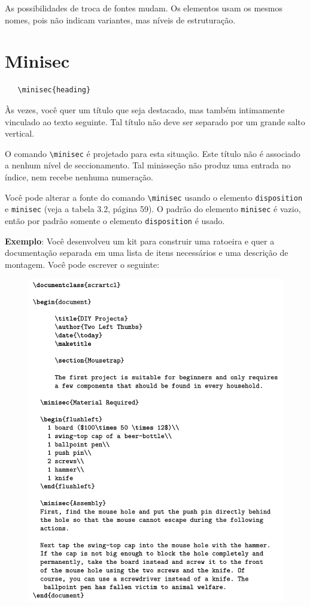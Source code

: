 As possibilidades de troca de fontes mudam. Os elementos usam os mesmos nomes, pois não indicam variantes, mas níveis de estruturação.

\section{Minisec}
\begin{verbatim}
   \minisec{heading} 
\end{verbatim}

Às vezes, você quer um título que seja destacado, mas também intimamente vinculado ao texto seguinte. Tal título não deve ser separado por um grande salto vertical.

O comando \verb|\minisec| é projetado para esta situação. Este título não é associado a nenhum nível de seccionamento. Tal minisseção não produz uma entrada no índice, nem recebe nenhuma numeração.

Você pode alterar a fonte do comando \verb|\minisec| usando o elemento \texttt{disposition} e \texttt{minisec} (veja a tabela 3.2, página 59). O padrão do elemento \texttt{minisec} é vazio, então por padrão somente o elemento \texttt{disposition} é usado.

\textbf{Exemplo}: Você desenvolveu um kit para construir uma ratoeira e quer a documentação separada em uma lista de itens necessários e uma descrição de montagem. Você pode escrever o seguinte:

\begin{figure}
    \centering
    \includegraphics[width=0.8\linewidth]{imagem21.png}
    \label{fig:img21}
\end{figure}

